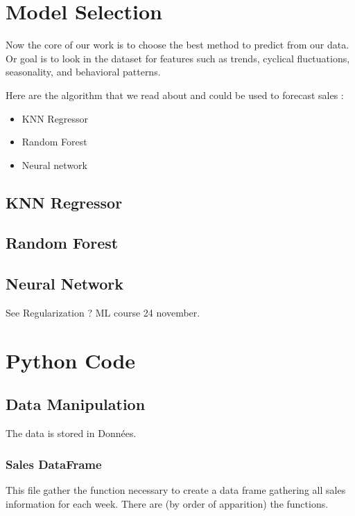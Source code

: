 \documentclass{report}
\begin{document}
\chapter{Model Selection}

Now the core of our work is to choose the best method to predict from our data. Or goal is to look in the dataset for features such as trends, cyclical fluctuations, seasonality, and behavioral patterns.


Here are the algorithm that we read about and could be used to forecast sales :
\begin{itemize}
\item KNN Regressor
\item Random Forest
\item Neural network
\end{itemize}

\section{KNN Regressor}


\section{Random Forest}


\section{Neural Network}




See Regularization ? ML course 24 november.

\chapter{Python Code}

\section{Data Manipulation}
The data is stored in Données.\\

\subsection{Sales DataFrame}

This file gather the function necessary to create a data frame gathering all sales information for each week. There are (by order of apparition) the functions.
\end{document}
